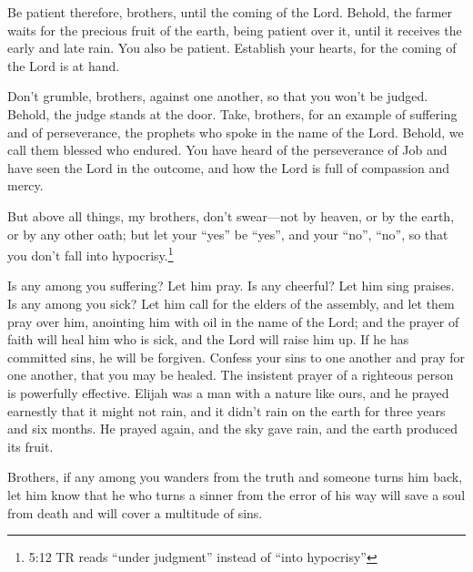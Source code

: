 \myverse{}Be patient therefore, brothers, until the coming of the Lord. Behold,
the farmer waits for the precious fruit of the earth, being patient over it, until it receives the early
and late rain.
\myverse{}You also be patient. Establish your hearts, for the coming of the Lord is at
hand.

\myverse{}Don’t grumble, brothers, against one another, so that you won’t
be judged. Behold, the judge stands at the door.
\myverse{}Take, brothers, for an example of suffering and of perseverance, the prophets
who spoke in the name of the Lord.
\myverse{}Behold, we call them blessed who endured. You have heard of the perseverance
of Job and have seen the Lord in the outcome, and how the Lord is full of compassion and mercy.

\myverse{}But above all things, my brothers, don’t swear—not by heaven,
or by the earth, or by any other oath; but let your “yes” be “yes”, and your “no”, “no”, so that you don’t
fall into hypocrisy.\footnote{5:12 TR reads “under judgment” instead of “into hypocrisy”}

\myverse{}Is any among you suffering? Let him pray. Is any cheerful? Let
him sing praises.
\myverse{}Is any among you sick? Let him call for the elders of the assembly, and let
them pray over him, anointing him with oil in the name of the Lord;
\myverse{}and the prayer of faith will heal him who is sick, and the Lord will raise
him up. If he has committed sins, he will be forgiven.
\myverse{}Confess your sins to one another and pray for one another, that you may be
healed. The insistent prayer of a righteous person is powerfully effective.
\myverse{}Elijah was a man with a nature like ours, and he prayed earnestly that it
might not rain, and it didn’t rain on the earth for three years and six months.
\myverse{}He prayed again, and the sky gave rain, and the earth produced its fruit.

\myverse{}Brothers, if any among you wanders from the truth and someone
turns him back,
\myverse{}let him know that he who turns a sinner from the error of his way will save
a soul from death and will cover a multitude of sins.



